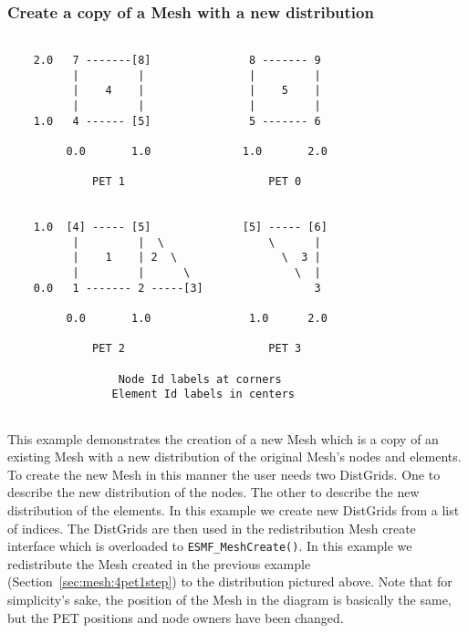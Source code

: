 
  \subsubsection{Create a copy of a Mesh with a new distribution}
  \begin{minipage}{\linewidth} 
  \begin{verbatim}
  
    2.0   7 -------[8]               8 ------- 9          
          |         |                |         |
          |    4    |                |    5    |
          |         |                |         |
    1.0   4 ------ [5]               5 ------- 6
          
         0.0       1.0              1.0       2.0
  
             PET 1                      PET 0
  
  
    1.0  [4] ----- [5]              [5] ----- [6]
          |         |  \                \      |
          |    1    | 2  \                \  3 |
          |         |      \                \  |
    0.0   1 ------- 2 -----[3]                 3
  
         0.0       1.0               1.0      2.0 
   
             PET 2                      PET 3
  
                 Node Id labels at corners
                Element Id labels in centers
  
  \end{verbatim}
  \end{minipage}
  
   This example demonstrates the creation of a new Mesh which is a copy of an existing Mesh
   with a new distribution of the original Mesh's nodes and elements. To create the new Mesh 
   in this manner the user needs two DistGrids. One to describe the new distribution of the nodes. 
   The other to describe the new distribution of the elements. In this example we create new 
   DistGrids from a list of indices. The DistGrids are then used in the redistribution 
   Mesh create interface which is overloaded to {\tt ESMF\_MeshCreate()}. In this example
   we redistribute the Mesh created in the previous example (Section~\ref{sec:mesh:4pet1step}) 
   to the distribution pictured above. Note that for simplicity's sake, the position of the
   Mesh in the diagram is basically the same, but the PET positions and node owners 
   have been changed. 
   
